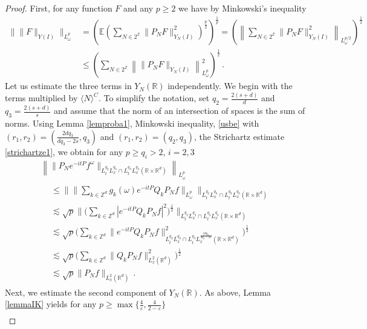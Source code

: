 \documentclass[10pt,leqno]{amsart}
\newcommand{\R}{\mathbb{R}}
\numberwithin{equation}{section}
\newcommand{\Z}{\mathbb{Z}}
\begin{document}
\begin{proof}
First, for any function $F$ and any $p \geq 2$ we have by Minkowski's inequality 
\begin{align*}
\|\|F \|_{Y(I)} \|_{L_\omega^p} &=  \left(\mathbb{E}\left(\sum_{N \in 2^\Z} \|P_N F\|_{Y_N(I)}^2 \right)^{\frac{p}{2}}\right)^{\frac{1}{p}} = 
\left( \left\|\sum_{N \in 2^\Z} \|P_N F\|_{Y_N(I)}^2 \right\|_{L_\omega^{p/2 }} \right)^{\frac{1}{2}} \\
&\leq 
\left(\sum_{N \in 2^\Z} \left\| \|P_NF\|_{Y_N(I)} \right\|_{L_\omega^{p }}^2 \right)^{\frac{1}{2}} \,.
\end{align*}
Let us estimate the three terms in $Y_N(\R)$ independently. We begin with the terms multiplied by $\langle N \rangle^C$. To simplify the notation,  set $q_2=\frac{2(s+d)}{d}$ and $q_3=\frac{2(s+d)}{s}$
and assume that the norm of an intersection of spaces is the sum of norms.  Using Lemma \ref{lemproba1},
Minkowski inequality, \eqref{usbe} with $(r_1, r_2) = (\frac{2dq_3 }{dq_3 -2s}, q_3)$ and $(r_1, r_2) = (q_2, q_3)$, the Strichartz estimate \eqref{strichartze1}, we obtain for any $p \geq q_i > 2$, $i = 2, 3$
\begin{multline*}
\left\|\|P_{N}e^{-it P} f^\omega \|_{L_t^{q_2} L_x^{q_3} \cap L_t^{q_3} L_x^{q_3} (\R \times \R^d) }  \right\|_{L_\omega^p}\\
\begin{aligned}
&\leq \Big\|  \Big\| \sum_{k \in \Z^d} g_k (\omega) e^{-it P}  Q_k P_N f \Big\|_{L_\omega^p} \Big\|_{L_t^{q_2} L_x^{q_3} \cap L_t^{q_3} L_x^{q_3} (\R \times \R^d) } \\
&\lesssim \sqrt{p} \Big\| \Big( \sum_{k \in \Z^d}  |e^{-it P}  Q_k  P_N f|^2 \Big)^{\frac{1}{2}}  \Big\|_{L_t^{q_2} L_x^{q_3} \cap L_t^{q_3} L_x^{q_3} (\R\times \R^d) } \\
&\lesssim  \sqrt{p} \Big( \sum_{k \in \Z^d} \| e^{-it P}  Q_k P_N f  \|^2_{L_t^{q_2} L_x^{q_2} \cap L_t^{q_3} L_x^{\frac{2dq_3 }{dq_3 -2s}} (\R \times \R^d)}  \Big)^{\frac{1}{2}}\\
&\lesssim   \sqrt{p} \Big( \sum_{k \in \Z^d} \|  Q_k P_N f  \|^2_{L_x^2 (\R^d) } \Big)^{\frac{1}{2}}\\
&\lesssim \sqrt{p} \|P_N f\|_{L_x^2 (\R^d)} \,.
\end{aligned}
\end{multline*}
Next, we estimate the second component of $Y_N (\R)$.  As above, Lemma \ref{lemmaIK} yields for any $p \geq \max\{\frac{4}{\varepsilon}, \frac{4}{2 - \varepsilon}\}$
\begin{multline*}

\end{multline*}
\end{proof}
\end{document}
